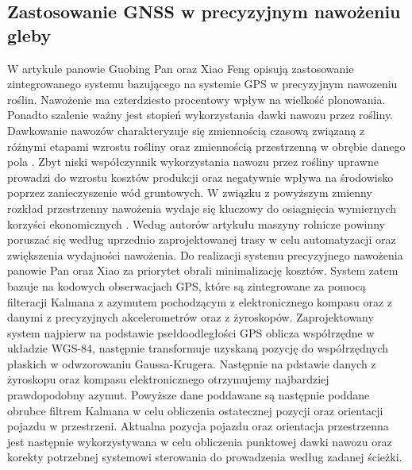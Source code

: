 \subsection{Zastosowanie GNSS w precyzyjnym nawożeniu gleby}
W artykule \cite{CCTA5_188_192} panowie Guobing Pan oraz Xiao Feng opisują zastosowanie zintegrowanego systemu bazującego na  systemie GPS w precyzyjnym nawozeniu roślin.
Nawożenie ma czterdziesto procentowy wpływ na wielkość plonowania. Ponadto szalenie ważny jest stopień wykorzystania dawki nawozu przez rośliny.
Dawkowanie nawozów charakteryzuje się zmiennością czasową związaną z różnymi etapami wzrostu rośliny oraz zmiennością przestrzenną w obrębie danego pola \cite{CCTA5_188_192}.
Zbyt niski współczynnik wykorzystania nawozu przez rośliny uprawne prowadzi do wzrostu kosztów produkcji 
oraz negatywnie wpływa na środowisko poprzez zanieczyszenie wód gruntowych.
W związku z powyższym  zmienny rozkład przestrzenny nawożenia wydaje się kluczowy do osiagnięcia wymiernych korzyści ekonomicznych \cite{CCTA5_188_192}.
Wedug autorów artykułu maszyny rolnicze powinny poruszać się według uprzednio zaprojektowanej trasy w celu automatyzacji oraz zwiększenia wydajności nawożenia.
Do realizacji systemu precyzyjnego nawożenia panowie Pan oraz Xiao za priorytet obrali minimalizację kosztów.
System zatem bazuje na kodowych obserwacjach GPS, które są zintegrowane za pomocą filteracji Kalmana
z azymutem pochodzącym z elektronicznego kompasu oraz z danymi z precyzyjnych akcelerometrów oraz z żyroskopów.
Zaprojektowany system najpierw na podstawie psełdoodległości GPS oblicza współrzędne w układzie WGS-84,
następnie transformuje uzyskaną pozycję do współrzędnych płaskich w odwzorowaniu Gaussa-Krugera.
Następnie na pdstawie danych z żyroskopu oraz kompasu elektronicznego otrzymujemy najbardziej prawdopodobny azymut.
Powyższe dane poddawane są następnie poddane obrubce filtrem Kalmana w celu obliczenia ostatecznej pozycji oraz orientacji pojazdu w przestrzeni.
Aktualna pozycja pojazdu oraz orientacja przestrzenna jest następnie wykorzystywana w celu obliczenia punktowej dawki nawozu
oraz korekty potrzebnej systemowi sterowania do prowadzenia według zadanej ścieżki.

